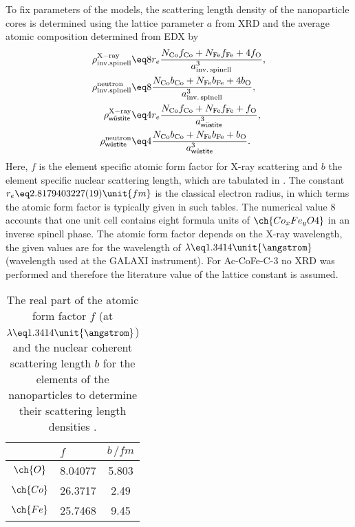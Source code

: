 \documentclass[\main/dresen_thesis.tex]{subfiles}
\begin{document}
    To fix parameters of the models, the scattering length density of the nanoparticle cores is determined using the lattice parameter $a$ from XRD and the average atomic composition determined from EDX by
    \begin{align}
      \label{eq:monolayer:charMethod:calcSLD}
      \rho^\mathrm{X-ray}_\mathrm{inv. spinell}   &\eq 8 r_e \frac{N_\mathrm{Co} f_\mathrm{Co} + N_\mathrm{Fe} f_\mathrm{Fe} + 4 f_\mathrm{O}}
                                                                  {a_\mathrm{inv.\,spinell}^3},\\
      \rho^\mathrm{neutron}_\mathrm{inv. spinell} &\eq 8 \frac{N_\mathrm{Co} b_\mathrm{Co} + N_\mathrm{Fe} b_\mathrm{Fe} + 4 b_\mathrm{O}}
                                                                  {a_\mathrm{inv.\,spinell}^3},\\
      \rho^\mathrm{X-ray}_\textsf{w\"ustite}      &\eq 4 r_e \frac{N_\mathrm{Co} f_\mathrm{Co} + N_\mathrm{Fe} f_\mathrm{Fe} + f_\mathrm{O}}
                                                                  {a_\textsf{w\"ustite}^3},\\
      \rho^\mathrm{neutron}_\textsf{w\"ustite}    &\eq 4 \frac{N_\mathrm{Co} b_\mathrm{Co} + N_\mathrm{Fe} b_\mathrm{Fe} + b_\mathrm{O}}
                                                              {a_\textsf{w\"ustite}^3}.
    \end{align}
    Here, $f$ is the element specific atomic form factor for X-ray scattering and $b$ the element specific nuclear scattering length, which are  tabulated in  \cite{Sears_1992_Neutr, BerkeleyLab_1993_asf}.
    The constant $r_e \eq 2.8179403227(19) \unit{fm}$ is the classical electron radius, in which terms the atomic form factor is typically given in such tables.
    The numerical value $8$ accounts that one unit cell contains eight formula units of $\ch{Co_xFe_yO4}$ in an inverse spinell phase.
    The atomic form factor depends on the X-ray wavelength, the given values are for the wavelength of $\lambda \eq 1.3414 \unit{\angstrom}$ (wavelength used at the GALAXI instrument).
    For Ac-CoFe-C-3 no XRD was performed and therefore the literature value of the lattice constant is assumed.
    \begin{table}[ht]
      \centering
      \caption{\label{tab:monolayers:charMethod:scatteringLenghts}The real part of the atomic form factor $f$ (at $\lambda \eq 1.3414 \unit{\angstrom}$) and the nuclear coherent scattering length $b$ for the elements of the nanoparticles to determine their scattering length densities \cite{Sears_1992_Neutr, BerkeleyLab_1993_asf}.}
      \begin{tabular}{ c | l | c }
                  & $f$       & $b \, / \unit{fm}$ \\
        \hline
        $\ch{O}$  & 8.04077   & 5.803   \\
        $\ch{Co}$ & 26.3717   & 2.49  \\
        $\ch{Fe}$ & 25.7468   & 9.45  \\
        \hline
      \end{tabular}
    \end{table}
    
\end{document}
